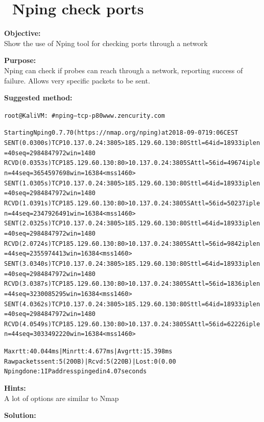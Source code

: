 \documentclass[a4paper,11pt,notitlepage]{report}
\begin{document}
\chapter{\faInfoCircle\ Nping check ports}
\label{ex:nping-tcp}
{\bf Objective:} \\
Show the use of Nping tool for checking ports through a network

{\bf Purpose:}\\
Nping can check if probes can reach through a network, reporting success of failure. Allows very specific packets to be sent.

{\bf Suggested method:}\\
\begin{alltt}\footnotesize
  root@KaliVM:~# nping --tcp -p 80 www.zencurity.com

  Starting Nping 0.7.70 ( https://nmap.org/nping ) at 2018-09-07 19:06 CEST
  SENT (0.0300s) TCP 10.137.0.24:3805 > 185.129.60.130:80 S ttl=64 id=18933 iplen=40  seq=2984847972 win=1480
  RCVD (0.0353s) TCP 185.129.60.130:80 > 10.137.0.24:3805 SA ttl=56 id=49674 iplen=44  seq=3654597698 win=16384 <mss 1460>
  SENT (1.0305s) TCP 10.137.0.24:3805 > 185.129.60.130:80 S ttl=64 id=18933 iplen=40  seq=2984847972 win=1480
  RCVD (1.0391s) TCP 185.129.60.130:80 > 10.137.0.24:3805 SA ttl=56 id=50237 iplen=44  seq=2347926491 win=16384 <mss 1460>
  SENT (2.0325s) TCP 10.137.0.24:3805 > 185.129.60.130:80 S ttl=64 id=18933 iplen=40  seq=2984847972 win=1480
  RCVD (2.0724s) TCP 185.129.60.130:80 > 10.137.0.24:3805 SA ttl=56 id=9842 iplen=44  seq=2355974413 win=16384 <mss 1460>
  SENT (3.0340s) TCP 10.137.0.24:3805 > 185.129.60.130:80 S ttl=64 id=18933 iplen=40  seq=2984847972 win=1480
  RCVD (3.0387s) TCP 185.129.60.130:80 > 10.137.0.24:3805 SA ttl=56 id=1836 iplen=44  seq=3230085295 win=16384 <mss 1460>
  SENT (4.0362s) TCP 10.137.0.24:3805 > 185.129.60.130:80 S ttl=64 id=18933 iplen=40  seq=2984847972 win=1480
  RCVD (4.0549s) TCP 185.129.60.130:80 > 10.137.0.24:3805 SA ttl=56 id=62226 iplen=44  seq=3033492220 win=16384 <mss 1460>

  Max rtt: 40.044ms | Min rtt: 4.677ms | Avg rtt: 15.398ms
  Raw packets sent: 5 (200B) | Rcvd: 5 (220B) | Lost: 0 (0.00%
  Nping done: 1 IP address pinged in 4.07 seconds
\end{alltt}

{\bf Hints:} \\
A lot of options are similar to Nmap

{\bf Solution:}\\
\end{document}
